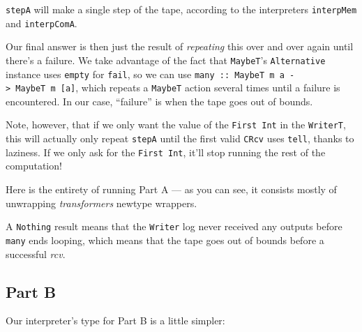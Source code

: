 \documentclass[]{article}
\newenvironment{Shaded}{}{}
\newcommand{\CommentTok}[1]{\textcolor[rgb]{0.38,0.63,0.69}{\textit{#1}}}
\newcommand{\DataTypeTok}[1]{\textcolor[rgb]{0.56,0.13,0.00}{#1}}
\newcommand{\FunctionTok}[1]{\textcolor[rgb]{0.02,0.16,0.49}{#1}}
\newcommand{\NormalTok}[1]{#1}
\newcommand{\OtherTok}[1]{\textcolor[rgb]{0.00,0.44,0.13}{#1}}
\begin{document}
\texttt{stepA} will make a single step of the tape, according to the
interpreters \texttt{interpMem} and \texttt{interpComA}.

Our final answer is then just the result of \emph{repeating} this over and over
again until there's a failure. We take advantage of the fact that
\texttt{MaybeT}'s \texttt{Alternative} instance uses \texttt{empty} for
\texttt{fail}, so we can use
\texttt{many\ ::\ MaybeT\ m\ a\ -\textgreater{}\ MaybeT\ m\ {[}a{]}}, which
repeats a \texttt{MaybeT} action several times until a failure is encountered.
In our case, ``failure'' is when the tape goes out of bounds.

Note, however, that if we only want the value of the \texttt{First\ Int} in the
\texttt{WriterT}, this will actually only repeat \texttt{stepA} until the first
valid \texttt{CRcv} uses \texttt{tell}, thanks to laziness. If we only ask for
the \texttt{First\ Int}, it'll stop running the rest of the computation!

Here is the entirety of running Part A --- as you can see, it consists mostly of
unwrapping \emph{transformers} newtype wrappers.

\begin{Shaded}
\end{Shaded}

A \texttt{Nothing} result means that the \texttt{Writer} log never received any
outputs before \texttt{many} ends looping, which means that the tape goes out of
bounds before a successful \emph{rcv}.

\hypertarget{part-b}{%
\subsection{Part B}\label{part-b}}

Our interpreter's type for Part B is a little simpler:
\end{document}
